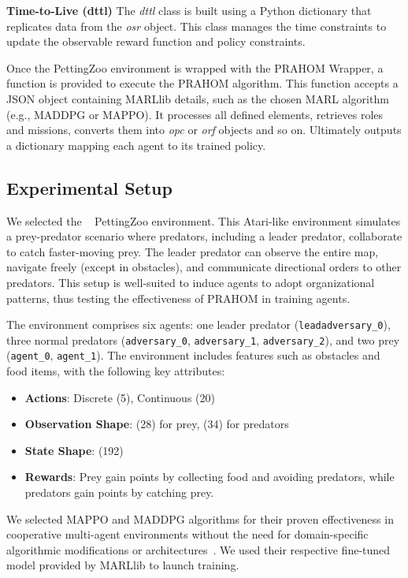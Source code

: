 \documentclass[runningheads]{llncs}
\theoremstyle{freethm}
\theoremstyle{proofoutline}
\begin{document}
\textbf{Time-to-Live (dttl)} \quad The \textit{dttl} class is built using a Python dictionary that replicates data from the \textit{osr} object. This class manages the time constraints to update the observable reward function and policy constraints.

Once the PettingZoo environment is wrapped with the PRAHOM Wrapper, a function is provided to execute the PRAHOM algorithm. This function accepts a JSON object containing MARLlib details, such as the chosen MARL algorithm (e.g., MADDPG or MAPPO). It processes all defined elements, retrieves roles and missions, converts them into \textit{opc} or \textit{orf} objects and so on. Ultimately outputs a dictionary mapping each agent to its trained policy.

\subsection{Experimental Setup}

We selected the ~\cite{Lowe2017} PettingZoo environment. This Atari-like environment simulates a prey-predator scenario where predators, including a leader predator, collaborate to catch faster-moving prey. The leader predator can observe the entire map, navigate freely (except in obstacles), and communicate directional orders to other predators. This setup is well-suited to induce agents to adopt organizational patterns, thus testing the effectiveness of PRAHOM in training agents.

The  environment comprises six agents: one leader predator (\texttt{leadadversary\_0}), three normal predators (\texttt{adversary\_0}, \texttt{adversary\_1}, \texttt{adversary\_2}), and two prey (\texttt{agent\_0}, \texttt{agent\_1}). The environment includes features such as obstacles and food items, with the following key attributes:

\begin{itemize}
    \item \textbf{Actions}: Discrete (5), Continuous (20)
    \item \textbf{Observation Shape}: (28) for prey, (34) for predators
    \item \textbf{State Shape}: (192)
    \item \textbf{Rewards}: Prey gain points by collecting food and avoiding predators, while predators gain points by catching prey.
\end{itemize}

\noindent We selected MAPPO and MADDPG algorithms for their proven effectiveness in cooperative multi-agent environments without the need for domain-specific algorithmic modifications or architectures~\cite{Yu2022}. We used their respective fine-tuned model provided by MARLlib to launch training.
\end{document}
